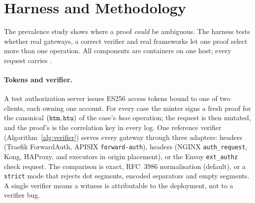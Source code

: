 \section{Harness and Methodology}\label{sec:harness}

The prevalence study shows where a proof \emph{could} be ambiguous. The
harness tests whether real gateways, a correct verifier and real frameworks
let one proof select more than one operation. All components are containers
on one host; every request carries .

\paragraph{Tokens and verifier.} A test authorization server issues ES256
access tokens bound to one of two clients, each owning one account. For every
case the minter signs a fresh proof for the canonical $(\texttt{htm},\texttt{htu})$ of the
case's \emph{base} operation; the request is then mutated, and the proof's
\jti is the correlation key in every log. One reference verifier
(Algorithm~\ref{alg:verifier}) serves every gateway through three adapters:
 headers (Traefik ForwardAuth, APISIX \texttt{forward-auth}),
 headers (NGINX \texttt{auth\_request}, Kong, HAProxy, and
executors in origin placement), or the Envoy \texttt{ext\_authz} check request.
The \htu comparison is exact, RFC~3986 normalisation (default), or a
\texttt{strict} mode that rejects dot segments, encoded separators and empty
segments. A single verifier means a witness is attributable to the deployment,
not to a verifier bug.

